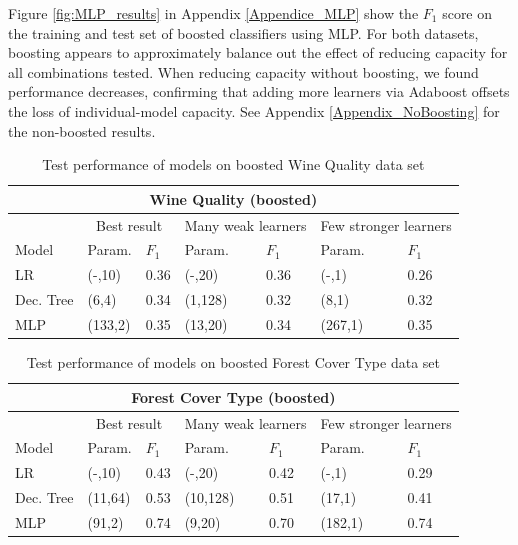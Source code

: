 \documentclass{article}
\begin{document}
Figure \ref{fig:MLP_results} in Appendix \ref{Appendice_MLP} show the $F_1$ score on the training and test set of boosted classifiers using MLP. For both datasets, boosting appears to approximately balance out the effect of reducing capacity for all combinations tested. When reducing capacity without boosting, we found performance decreases, confirming that adding more learners via Adaboost offsets the loss of individual-model capacity. See Appendix \ref{Appendix_NoBoosting} for the non-boosted results.

\begin{table}[h!]
\label{table:Results_Wine}
\caption {Test performance of models on boosted Wine Quality data set} \label{fig:results}
\begin{center}
\begin{tabular}{|l|l|l|l|l|l|l|}
    \hline
    \multicolumn{7}{|c|}{Wine Quality (boosted)}\\
    \hline
    &\multicolumn{2}{|c|}{Best result}&\multicolumn{2}{|c|}{Many weak learners}&\multicolumn{2}{|c|}{Few stronger learners}\\
    \hline
    Model & Param. & $F_1$ & Param. & $F_1$ & Param. & $F_1$ \\
    \hline \hline
     LR & (-,10) & 0.36 & (-,20) & 0.36 & (-,1) & 0.26 \\
     Dec. Tree & (6,4) & 0.34 & (1,128) & 0.32 & (8,1) & 0.32 \\
     MLP  & (133,2) & 0.35 & (13,20) & 0.34 & (267,1) & 0.35 \\
     \hline
\end{tabular}
\end{center}
\end{table}

\begin{table}[h!]
\label{Table:Results_Forest}
\caption {Test performance of models on boosted Forest Cover Type data set} \label{fig:results}
\begin{center}
\begin{tabular}{|l|l|l|l|l|l|l|}
    \hline
    \multicolumn{7}{|c|}{Forest Cover Type (boosted)}\\
    \hline
    &\multicolumn{2}{|c|}{Best result}&\multicolumn{2}{|c|}{Many weak learners}&\multicolumn{2}{|c|}{Few stronger learners}\\
    \hline
    Model & Param. & $F_1$ & Param. & $F_1$ & Param. & $F_1$ \\
    \hline \hline
     LR & (-,10) & 0.43 & (-,20) & 0.42 & (-,1) & 0.29 \\
     Dec. Tree & (11,64) & 0.53 & (10,128) & 0.51 & (17,1) & 0.41 \\
     MLP  & (91,2) & 0.74 & (9,20) & 0.70 & (182,1) & 0.74 \\
     \hline
\end{tabular}
\end{center}
\end{table}
\end{document}
